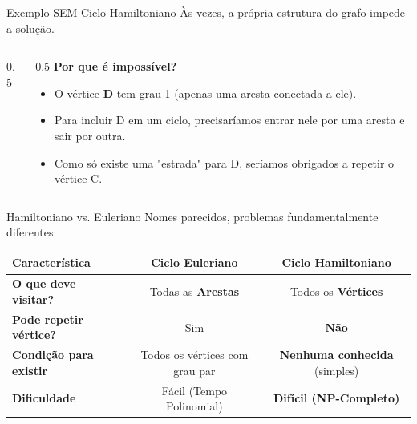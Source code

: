 \documentclass[10pt, aspectratio=169]{beamer}
\begin{document}
\begin{frame}{Exemplo SEM Ciclo Hamiltoniano}
    Às vezes, a própria estrutura do grafo impede a solução.
    
    \vspace{1em}
    \begin{columns}
        \begin{column}{0.5\textwidth}
            \centering
        \end{column}
        \begin{column}{0.5\textwidth}
            \textbf{Por que é impossível?}
            \begin{itemize}
                \item O vértice \textbf{D} tem grau 1 (apenas uma aresta conectada a ele).
                \item Para incluir D em um ciclo, precisaríamos entrar nele por uma aresta e sair por outra.
                \item Como só existe uma "estrada" para D, seríamos obrigados a repetir o vértice C.
            \end{itemize}
        \end{column}
    \end{columns}
\end{frame}

\begin{frame}{Hamiltoniano vs. Euleriano}
    Nomes parecidos, problemas fundamentalmente diferentes:
    
    \vspace{1em}
    \begin{table}[]
        \centering
        \begin{tabular}{@{}lcc@{}}
        \toprule
        \textbf{Característica} & \textbf{Ciclo Euleriano} & \textbf{Ciclo Hamiltoniano} \\ \midrule
        \textbf{O que deve visitar?} & Todas as \textbf{Arestas} & Todos os \textbf{Vértices} \\
        \textbf{Pode repetir vértice?} & Sim & \textbf{Não} \\
        \textbf{Condição para existir} & Todos os vértices com grau par & \textbf{Nenhuma conhecida} (simples) \\
        \textbf{Dificuldade} & Fácil (Tempo Polinomial) & \textbf{Difícil (NP-Completo)} \\ \bottomrule
        \end{tabular}
    \end{table}
\end{frame}
\end{document}
